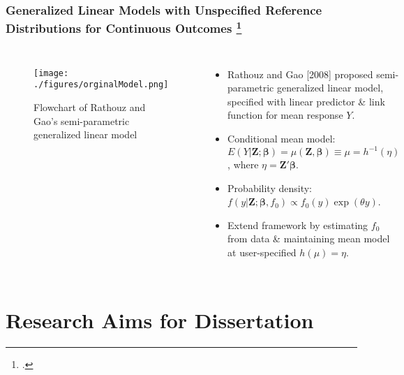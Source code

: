 \documentclass[hyperref={bookmarks=false},aspectratio=169]{beamer}
\begin{document}
\begin{frame}
\frametitle{Generalized Linear Models with Unspecified Reference Distributions for Continuous Outcomes \footcite{rathouz2008generalized}}

\begin{columns}


\begin{figure}
    \centering
    \texttt{[image: ./figures/orginalModel.png]}
    \caption{Flowchart of Rathouz and Gao's semi-parametric generalized linear model}
    \label{fig:RathouzGaoSPGLM}
\end{figure}

\begin{itemize}
    \item Rathouz and Gao [2008] proposed semi-parametric generalized linear model, specified with linear predictor {\&} link function for mean response $Y$.
    \item \alert{Conditional mean model}: $E\left( Y|\boldsymbol{Z};\boldsymbol{\beta} \right) =\mu\left( \boldsymbol{Z}, \boldsymbol{\beta} \right) \equiv \mu = h^{-1}\left( \eta\right)$, where $\eta = \boldsymbol{Z}' \boldsymbol{\beta}$.
    \item \alert{Probability density}: $f\left( y |\boldsymbol{Z};\boldsymbol{\beta}, f_0\right) \propto f_0\left( y\right) \exp(\theta y)$.
    \item Extend framework by estimating $f_0$ from data {\&} maintaining mean model at user-specified $h\left( \mu\right) =\eta$.
\end{itemize}

\end{columns}
\end{frame}



\section{Research Aims for Dissertation}
\end{document}
